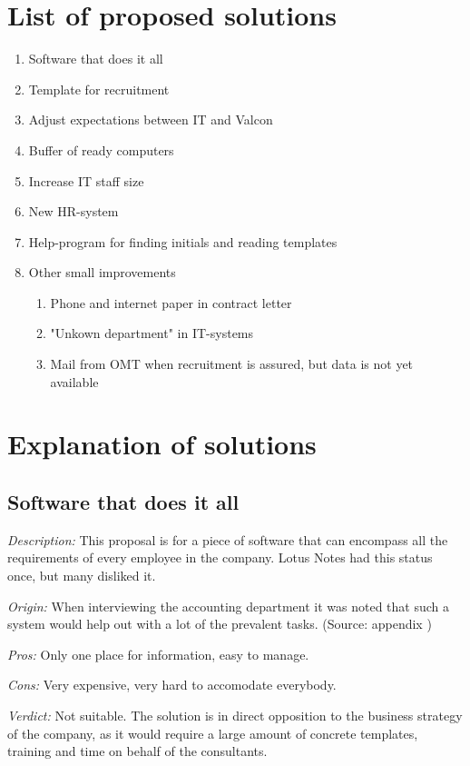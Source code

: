 \label{app:solution_propositions}
\section{List of proposed solutions}
\begin{enumerate}
\item Software that does it all
\item Template for recruitment
\item Adjust expectations between IT and Valcon
\item Buffer of ready computers
\item Increase IT staff size
\item New HR-system
\item Help-program for finding initials and reading templates
	\item Other small improvements
	\begin{enumerate}
	\item Phone and internet paper in contract letter
	\item "Unkown department" in IT-systems
	\item Mail from OMT when recruitment is assured, but data is not yet available
	\end{enumerate}
\end{enumerate}

\section{Explanation of solutions}
\subsection{Software that does it all}
\emph{Description:} This proposal is for a piece of software that can encompass all the requirements of every employee in the company. Lotus Notes had this status once, but many disliked it.

\emph{Origin:}
When interviewing the accounting department it was noted that such a system would help out with a lot of the prevalent tasks.
(Source: appendix )

 \emph{Pros:} Only one place for information, easy to manage.

 \emph{Cons:} Very expensive, very hard to accomodate everybody.

\emph {Verdict:}
Not suitable. The solution is in direct opposition to the business strategy of the company, as it would require a large amount of concrete templates, training and time on behalf of the consultants.

